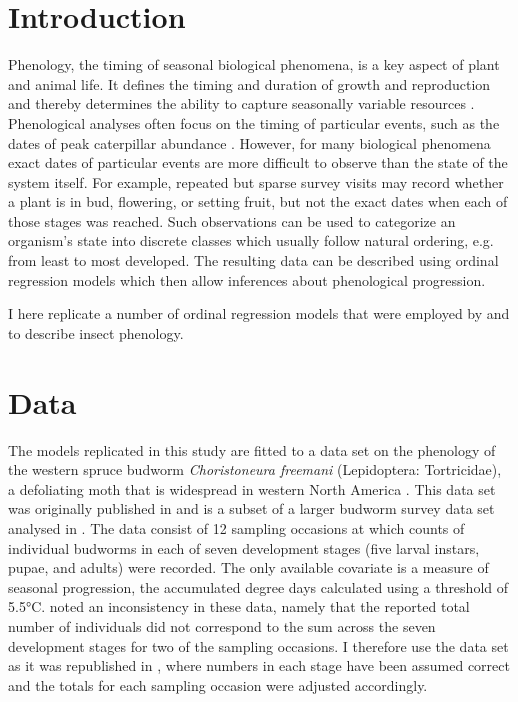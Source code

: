 \section{Introduction}

Phenology, the timing of seasonal biological phenomena, is a key aspect of plant and animal life.
It defines the timing and duration of growth and reproduction and thereby determines the ability to capture seasonally variable resources \citep{chuine2017process}.
Phenological analyses often focus on the timing of particular events, such as the dates of peak caterpillar abundance \citep{shutt2019spatial}.
However, for many biological phenomena exact dates of particular events are more difficult to observe than the state of the system itself.
For example, repeated but sparse survey visits may record whether a plant is in bud, flowering, or setting fruit, but not the exact dates when each of those stages was reached.
Such observations can be used to categorize an organism's state into discrete classes which usually follow natural ordering, e.g. from least to most developed. 
The resulting data can be described using ordinal regression models \cite{mccullagh1980regression,agresti2010analysis} which then allow inferences about phenological progression.

I here replicate a number of ordinal regression models that were employed by \citet{dennis1986stochastic} and \citet{candy1991modeling} to describe insect phenology. 

\section{Data}
\label{sec:data}
The models replicated in this study are fitted to a data set on the phenology of the western spruce budworm \emph{Choristoneura freemani} (Lepidoptera: Tortricidae), a defoliating moth that is widespread in western North America \citep{brookes1987western}.
This data set was originally published in \citep{dennis1986stochastic} and is a subset of a larger budworm survey data set analysed in \citep{kemp1986stochastic}. 
The data consist of 12 sampling occasions at which counts of individual budworms in each of seven development stages (five larval instars, pupae, and adults) were recorded. 
The only available covariate is a measure of seasonal progression, the accumulated degree days calculated using a threshold of 5.5°C. 
\citet{candy1991modeling} noted an inconsistency in these data, namely that the reported total number of individuals did not correspond to the sum across the seven development stages for two of the sampling occasions. 
I therefore use the data set as it was republished in \citep{candy1990biology}, where numbers in each stage have been assumed correct and the totals for each sampling occasion were adjusted accordingly.

